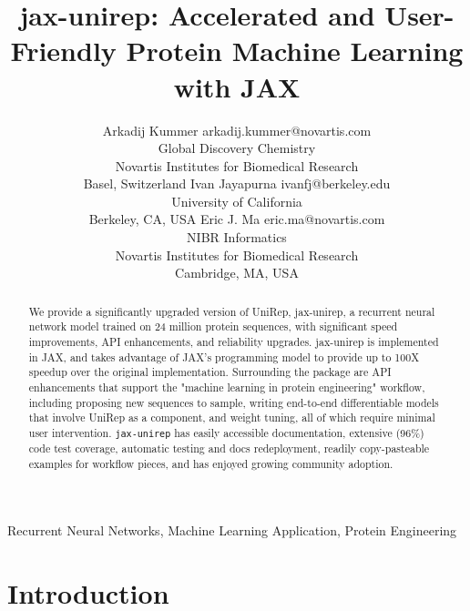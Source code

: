 \documentclass[twoside,11pt]{article}
\begin{document}
\title{jax-unirep: Accelerated and User-Friendly Protein Machine Learning with JAX}

\author{
    \name Arkadij Kummer \email arkadij.kummer@novartis.com \\
    \addr Global Discovery Chemistry\\
    Novartis Institutes for Biomedical Research\\
    Basel, Switzerland
    \AND
    \name Ivan Jayapurna \email ivanfj@berkeley.edu \\
    \addr University of California\\
    Berkeley, CA, USA
    \AND
    \name Eric J. Ma \email eric.ma@novartis.com \\
    \addr NIBR Informatics\\
    Novartis Institutes for Biomedical Research\\
    Cambridge, MA, USA
}

\editor{}

\maketitle

\begin{abstract}%
We provide a significantly upgraded version of UniRep, jax-unirep,
a recurrent neural network model trained on 24 million protein sequences,
with significant speed improvements,
API enhancements,
and reliability upgrades.
jax-unirep is implemented in JAX,
and takes advantage of JAX's programming model
to provide up to 100X speedup over the original implementation.
Surrounding the package are API enhancements
that support the "machine learning in protein engineering" workflow,
including proposing new sequences to sample,
writing end-to-end differentiable models that involve UniRep as a component,
and weight tuning,
all of which require minimal user intervention.
\verb|jax-unirep| has easily accessible documentation,
extensive (96\%) code test coverage,
automatic testing and docs redeployment,
readily copy-pasteable examples for workflow pieces,
and has enjoyed growing community adoption.
\end{abstract}

\begin{keywords}
  Recurrent Neural Networks, Machine Learning Application, Protein Engineering
\end{keywords}

\section{Introduction}
\end{document}
